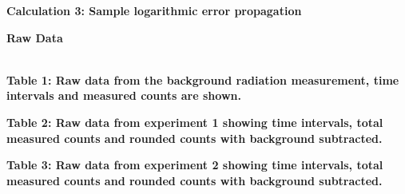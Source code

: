 \documentclass[
	letterpaper, %
	10pt, %
]{CSUniSchoolLabReport}
\begin{document}
\begin{center}
	\textbf{Calculation 3: Sample logarithmic error propagation}
\end{center}
\newpage
{\Large\textbf{Raw Data}}\\
\vspace{20pt}\\
\begin{center}

\end{center}
\begin{center}
	\textbf{Table 1: Raw data from the background radiation measurement, time intervals and measured counts are shown.}
\end{center}

\begin{center}
	\textbf{Table 2: Raw data from experiment 1 showing time intervals, total measured counts and rounded counts with background subtracted.}
\end{center}

\begin{center}
	\textbf{Table 3: Raw data from experiment 2 showing time intervals, total measured counts and rounded counts with background subtracted.}
\end{center}
\end{document}
